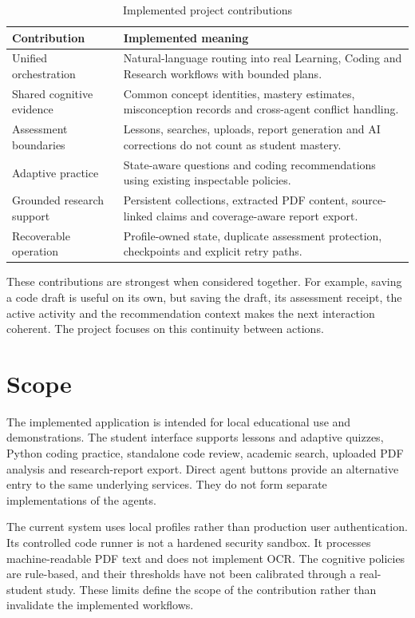 \begin{table}[htbp]\centering\small
\caption{Implemented project contributions}\label{tab:contributions}
\begin{tabular}{P{0.26\textwidth}P{0.66\textwidth}}\toprule
Contribution & Implemented meaning\\\midrule
Unified orchestration & Natural-language routing into real Learning, Coding and Research workflows with bounded plans.\\
Shared cognitive evidence & Common concept identities, mastery estimates, misconception records and cross-agent conflict handling.\\
Assessment boundaries & Lessons, searches, uploads, report generation and AI corrections do not count as student mastery.\\
Adaptive practice & State-aware questions and coding recommendations using existing inspectable policies.\\
Grounded research support & Persistent collections, extracted PDF content, source-linked claims and coverage-aware report export.\\
Recoverable operation & Profile-owned state, duplicate assessment protection, checkpoints and explicit retry paths.\\\bottomrule
\end{tabular}
\end{table}

These contributions are strongest when considered together. For example, saving a code draft is useful on its own, but saving the draft, its assessment receipt, the active activity and the recommendation context makes the next interaction coherent. The project focuses on this continuity between actions.

\section{Scope}
The implemented application is intended for local educational use and demonstrations. The student interface supports lessons and adaptive quizzes, Python coding practice, standalone code review, academic search, uploaded PDF analysis and research-report export. Direct agent buttons provide an alternative entry to the same underlying services. They do not form separate implementations of the agents.

The current system uses local profiles rather than production user authentication. Its controlled code runner is not a hardened security sandbox. It processes machine-readable PDF text and does not implement OCR. The cognitive policies are rule-based, and their thresholds have not been calibrated through a real-student study. These limits define the scope of the contribution rather than invalidate the implemented workflows.

